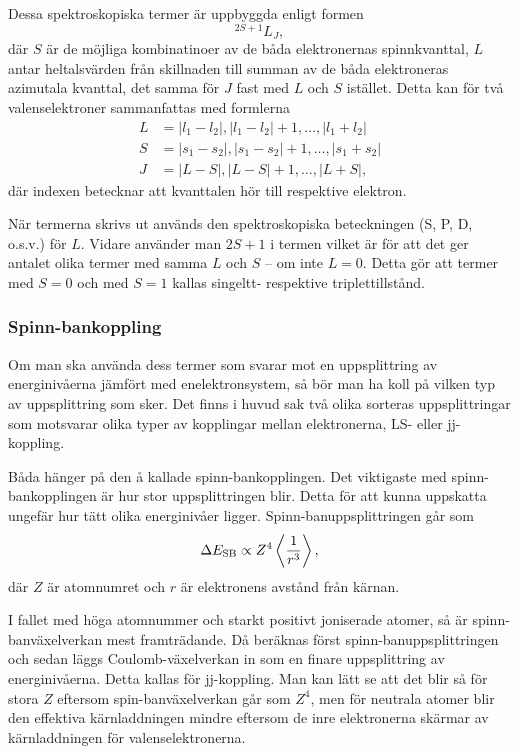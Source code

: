 \documentclass[11pt,a4paper]{article}
\begin{document}
Dessa spektroskopiska termer är uppbyggda enligt formen \cite{Bransden}
\[
^{2S+1}L_J,
\]
där $S$ är de möjliga kombinatinoer av de båda elektronernas
spinnkvanttal, $L$ antar heltalsvärden från skillnaden till summan av
de båda elektroneras azimutala kvanttal, det samma för $J$ fast med
$L$ och $S$ istället. Detta kan för två valenselektroner sammanfattas
med formlerna \cite{Bransden}
\begin{equation*}
\begin{aligned}
L &= |l_1-l_2|, |l_1- l_2|+1, \ldots, |l_1+l_2|\\
S &= |s_1-s_2|, |s_1- s_2|+1, \ldots, |s_1+s_2|\\
J &= |L-S|, |L-S| +1, \ldots, |L+S|,
\end{aligned}
\end{equation*}
där indexen betecknar att kvanttalen hör till respektive elektron.

När termerna skrivs ut används den spektroskopiska beteckningen (S, P,
D, o.s.v.) för $L$. Vidare använder man $2S+1$ i termen vilket är för
att det ger antalet olika termer med samma $L$ och $S$ -- om inte
$L=0$. Detta gör att termer med $S=0$ och med $S=1$ kallas singeltt-
respektive triplettillstånd. 

\subsubsection{Spinn-bankoppling}
Om man ska använda dess termer som svarar mot en uppsplittring av energinivåerna
jämfört med enelektronsystem, så bör man ha koll på vilken typ av uppsplittring
som sker. Det finns i huvud sak två olika sorteras uppsplittringar som motsvarar
olika typer av kopplingar mellan elektronerna, LS- eller jj-koppling. 

Båda hänger på den å kallade spinn-bankopplingen. Det viktigaste med
spinn-bankopplingen är hur stor uppsplittringen blir. Detta för att kunna
uppskatta ungefär hur tätt olika energinivåer ligger. Spinn-banuppsplittringen
går som\cite{Bransden} 
\[
\Delta E_\text{SB} \propto Z^4 \ev{\frac{1}{r^3}},
\]
där $Z$ är atomnumret och $r$ är elektronens avstånd från kärnan.

I fallet med höga atomnummer och starkt positivt joniserade atomer, så är
spinn-banväxelverkan mest framträdande. Då beräknas först
spinn-banuppsplittringen och sedan läggs Coulomb-växelverkan in som en
finare uppsplittring av energinivåerna. Detta kallas för
jj-koppling. Man kan lätt se att det blir så för stora $Z$ eftersom
spin-banväxelverkan går som $Z^4$, men för neutrala atomer blir den
effektiva kärnladdningen mindre eftersom de inre elektronerna skärmar
av kärnladdningen för valenselektronerna. 
\end{document}
